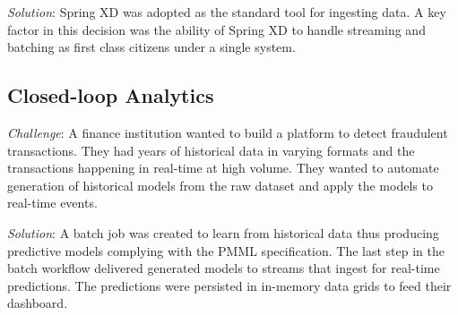 \textit{Solution}: Spring XD was adopted as the standard tool for ingesting data.
A key factor in this decision was the ability of Spring XD to handle streaming
and batching as first class citizens under a single system.

\subsection{Closed-loop Analytics}
\textit{Challenge}: A finance institution wanted to build a platform to detect
fraudulent transactions. They had years of historical data in varying formats
and the transactions happening in real-time at high volume. They wanted to
automate generation of historical models from the raw dataset and apply the models
to real-time events.

\textit{Solution}: A batch job was created to learn from historical data thus
producing predictive models complying with the PMML specification. The last step
in the batch workflow delivered generated models to streams that ingest for
real-time predictions. The predictions were persisted in in-memory data grids
to feed their dashboard.
